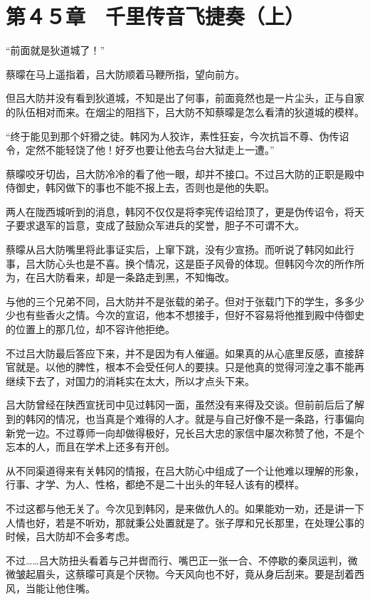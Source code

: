 \section{第４５章　千里传音飞捷奏（上）}

“前面就是狄道城了！”

蔡曚在马上遥指着，吕大防顺着马鞭所指，望向前方。

但吕大防并没有看到狄道城，不知是出了何事，前面竟然也是一片尘头，正与自家的队伍相对而来。在烟尘的阻挡下，吕大防不知蔡曚是怎么看清的狄道城的模样。

“终于能见到那个奸猾之徒。韩冈为人狡诈，素性狂妄，今次抗旨不尊、伪传诏令，定然不能轻饶了他！好歹也要让他去乌台大狱走上一遭。”

蔡曚咬牙切齿，吕大防冷冷的看了他一眼，却并不接口。不过吕大防的正职是殿中侍御史，韩冈做下的事也不能不报上去，否则也是他的失职。

两人在陇西城听到的消息，韩冈不仅仅是将李宪传诏给顶了，更是伪传诏令，将天子要求退军的旨意，变成了鼓励众军进兵的奖誉，胆子不可谓不大。

蔡曚从吕大防嘴里将此事证实后，上窜下跳，没有少宣扬。而听说了韩冈如此行事，吕大防心头也是不喜。换个情况，这是臣子风骨的体现。但韩冈今次的所作所为，在吕大防看来，却是一条路走到黑，不知悔改。

与他的三个兄弟不同，吕大防并不是张载的弟子。但对于张载门下的学生，多多少少也有些香火之情。今次的宣诏，他本不想接手，但好不容易将他推到殿中侍御史的位置上的那几位，却不容许他拒绝。

不过吕大防最后答应下来，并不是因为有人催逼。如果真的从心底里反感，直接辞官就是。以他的脾性，根本不会受任何人的要挟。只是他真的觉得河湟之事不能再继续下去了，对国力的消耗实在太大，所以才点头下来。

吕大防曾经在陕西宣抚司中见过韩冈一面，虽然没有来得及交谈。但前前后后了解到的韩冈的情况，也当真是个难得的人才。就是与自己好像不是一条路，行事偏向新党一边。不过尊师一向却做得极好，兄长吕大忠的家信中屡次称赞了他，不是个忘本的人，而且在学术上还多有开创。

从不同渠道得来有关韩冈的情报，在吕大防心中组成了一个让他难以理解的形象，行事、才学、为人、性格，都绝不是二十出头的年轻人该有的模样。

不过这都与他无关了。今次见到韩冈，是来做仇人的。如果能劝一劝，还是讲一下人情也好，若是不听劝，那就秉公处置就是了。张子厚和兄长那里，在处理公事的时候，吕大防却不会多考虑。

不过……吕大防扭头看着与己并辔而行、嘴巴正一张一合、不停歇的秦凤运判，微微皱起眉头，这蔡曚可真是个厌物。今天风向也不好，竟从身后刮来。要是刮着西风，当能让他住嘴。

